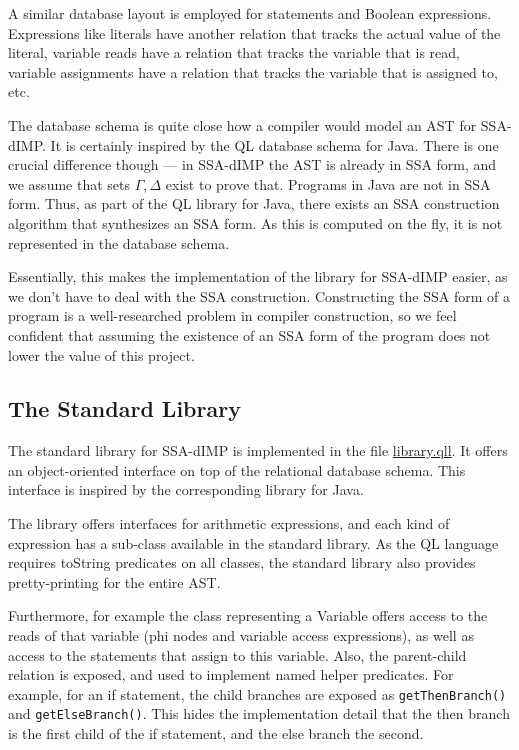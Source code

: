 A similar database layout is employed for statements and Boolean expressions.
Expressions like literals have another relation that tracks the actual value of the
literal, variable reads have a relation that tracks the variable that is read,
variable assignments have a relation that tracks the variable that is assigned to, etc.

The database schema is quite close how a compiler would model an AST for SSA-dIMP.
It is certainly inspired by the QL database schema for Java.
There is one crucial difference though --- in SSA-dIMP the AST is already in SSA form,
and we assume that sets $\Gamma, \Delta$ exist to prove that.
Programs in Java are not in SSA form.
Thus, as part of the QL library for Java, there exists an SSA construction algorithm
that synthesizes an SSA form.
As this is computed on the fly, it is not represented in the database schema.

Essentially, this makes the implementation of the library for SSA-dIMP easier,
as we don't have to deal with the SSA construction.
Constructing the SSA form of a program is a well-researched problem in compiler
construction, so we feel confident that assuming the existence of an SSA form 
of the program does not lower the value of this project.

\subsection{The Standard Library}
The standard library for SSA-dIMP is implemented in the file \hyperref[lst:library]{library.qll}.
It offers an object-oriented interface on top of the relational
database schema.
This interface is inspired by the corresponding library for Java.

The library offers interfaces for arithmetic expressions, and each kind of expression
has a sub-class available in the standard library.
As the QL language requires toString predicates on all classes,
the standard library also provides pretty-printing for the entire AST.

Furthermore, for example the class representing a Variable offers access to the
reads of that variable (phi nodes and variable access expressions), as well
as access to the statements that assign to this variable.
Also, the parent-child relation is exposed, and used to implement named helper predicates.
For example, for an if statement, the child branches are exposed as \texttt{getThenBranch()}
and \texttt{getElseBranch()}.
This hides the implementation detail that the then branch is the first child of the
if statement, and the else branch the second.

